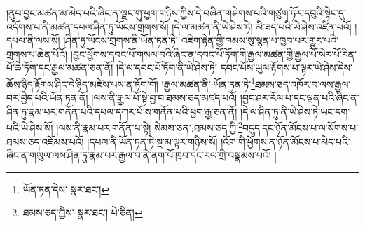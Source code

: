 །ནུབ་བྱང་མཚན་མ་མེད་པའི་ཞིང་ན་ལྗང་གུ་ཕྱག་གཉིས་ཀྱིས་དེ་བཞིན་གཤེགས་པའི་གཙུག་ཏོར་དབུའི་སྟེང་དུ་འདོགས་པ་ནི་མཚན་དཔལ་ཤིན་ཏུ་ཡོངས་གྲགས་སོ། །དེ་ལ་མཚན་ནི་ཡེ་ཤེས་ཏེ། མི་ཟད་པའི་ཡེ་ཤེས་འཛིན་པའོ། །དཔལ་ནི་ལས་སོ། །ཤིན་ཏུ་ཡོངས་གྲགས་ནི་ཡོན་ཏན་ཏེ། འཇིག་རྟེན་གྱི་ཁམས་སུ་སྙན་པ་ཁྱབ་པར་གྱུར་པའི་གྲགས་པ་ཆེན་པོའོ། །བྱང་ཕྱོགས་དབང་པོ་གསལ་བའི་ཞིང་ན་དབང་པོ་ཏོག་གི་རྒྱལ་མཚན་གྱི་རྒྱལ་པོ་སེར་པོ་རིན་པོ་ཆེ་ཏོག་དང་རྒྱལ་མཚན་ཅན་ནོ། །དེ་ལ་དབང་པོ་ཏོག་ནི་ཡེ་ཤེས་ཏེ། དབང་པོས་ཡུལ་རྟོགས་པ་ལྟར་ཡེ་ཤེས་དེས་ཆོས་ཉིད་རྟོགས་ཤིང་དེ་ཉིད་མཛེས་པས་ན་ཏོག་གོ། །རྒྱལ་མཚན་ནི་:ཡོན་ཏན་ཏེ་\footnote{ཡོན་ཏན་དེས་  སྣར་ཐང་། }ཐམས་ཅད་འཁོར་བ་ལས་རྒྱལ་བར་བྱེད་པའི་ཡོན་ཏན་ནོ། །ལས་ནི་རྒྱལ་པོ་སྟེ་བྱ་བ་ཐམས་ཅད་མཛད་པའོ། །བྱང་ཤར་རོལ་པ་དང་ལྡན་པའི་ཞིང་ན་ཤིན་ཏུ་རྣམ་པར་གནོན་པའི་དཔལ་དཀར་པོ་ས་གནོན་པའི་ཕྱག་རྒྱ་ཅན་ནོ། །དེ་ལ་ཤིན་ཏུ་ནི་ཡེ་ཤེས་ཏེ་ཡང་དག་པའི་ཡེ་ཤེས་སོ། །ལས་ནི་རྣམ་པར་གནོན་པ་སྟེ། སེམས་ཅན་:ཐམས་ཅད་ཀྱི་\footnote{ཐམས་ཅད་ཀྱིས་  སྣར་ཐང་།  པེ་ཅིན། }བདུད་དང་ཉོན་མོངས་པ་ལ་སོགས་པ་ཐམས་ཅད་འཇོམས་པའོ། །དཔལ་ནི་ཡོན་ཏན་ཏེ་སྔ་མ་ལྟར་གཉིས་སོ། །འོག་གི་ཕྱོགས་ན་ཉོན་མོངས་པ་མེད་པའི་ཞིང་ན་གཡུལ་ལས་ཤིན་ཏུ་རྣམ་པར་རྒྱལ་བ་ནི་ནག་པོ་ཁྲབ་དང་རལ་གྲི་བསྣམས་པའོ། །
